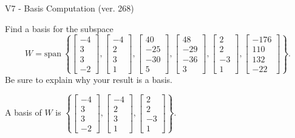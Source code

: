 \begin{exercise}
  \begin{exerciseTitle}V7 - Basis Computation (ver. 268)\end{exerciseTitle}
  \begin{exerciseStatement}
    Find a basis for the subspace 
\[W=\mathrm{span}\ \left\{\left[\begin{array}{r}
-4 \\
3 \\
3 \\
-2
\end{array}\right] , \left[\begin{array}{r}
-4 \\
2 \\
3 \\
1
\end{array}\right] , \left[\begin{array}{r}
40 \\
-25 \\
-30 \\
5
\end{array}\right] , \left[\begin{array}{r}
48 \\
-29 \\
-36 \\
3
\end{array}\right] , \left[\begin{array}{r}
2 \\
2 \\
-3 \\
1
\end{array}\right] , \left[\begin{array}{r}
-176 \\
110 \\
132 \\
-22
\end{array}\right]\right\}.\]
 Be sure to explain why your result is a basis.


  \end{exerciseStatement}
  \begin{exerciseAnswer}
   A basis of \(W\) is  \(\left\{\left[\begin{array}{r}
-4 \\
3 \\
3 \\
-2
\end{array}\right] , \left[\begin{array}{r}
-4 \\
2 \\
3 \\
1
\end{array}\right] , \left[\begin{array}{r}
2 \\
2 \\
-3 \\
1
\end{array}\right]\right\}\).
  


  \end{exerciseAnswer}
\end{exercise}